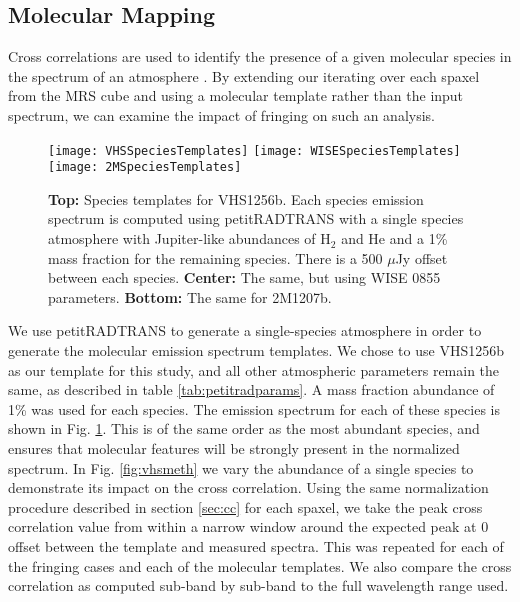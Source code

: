 \subsection{Molecular Mapping}
Cross correlations are used to identify the presence of a given molecular species in the spectrum of an atmosphere \parencite{Hoeijmakers2018,Haffert2019}.
By extending our iterating over each spaxel from the MRS cube and using a molecular template rather than the input spectrum, we can examine the impact of fringing on such an analysis.
\begin{figure}[t]
	\texttt{[image: VHSSpeciesTemplates]}
	\texttt{[image: WISESpeciesTemplates]}
	\texttt{[image: 2MSpeciesTemplates]}
	\caption{\textbf{Top:} Species templates for VHS1256b. Each species emission spectrum is computed using petitRADTRANS with a single species atmosphere with Jupiter-like abundances of H$_{2}$ and He and a 1\% mass fraction for the remaining species. There is a 500 $\mu$Jy offset between each species. \textbf{Center:} The same, but using WISE 0855 parameters. \textbf{Bottom:} The same for 2M1207b.}
	\label{fig:speciestemplates}
\end{figure}

We use petitRADTRANS to generate a single-species atmosphere in order to generate the molecular emission spectrum templates. 
We chose to use VHS1256b as our template for this study, and all other atmospheric parameters remain the same, as described in table \ref{tab:petitradparams}. 
A mass fraction abundance of 1\% was used for each species.
The emission spectrum for each of these species is shown in Fig. \ref{fig:speciestemplates}.
This is of the same order as the most abundant species, and ensures that molecular features will be strongly present in the normalized spectrum.
In Fig. \ref{fig:vhsmeth} we vary the abundance of a single species to demonstrate its impact on the cross correlation.
Using the same normalization procedure described in section \ref{sec:cc} for each spaxel, we take the peak cross correlation value from within a narrow window around the expected peak at 0 offset between the template and measured spectra. 
This was repeated for each of the fringing cases and each of the molecular templates. 
We also compare the cross correlation as computed sub-band by sub-band to the full wavelength range used.
\clearpage
